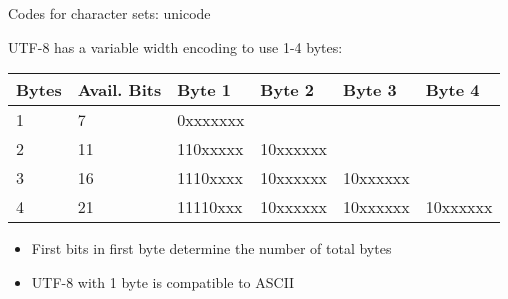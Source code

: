 \documentclass[11pt,compress,t,notes=noshow, xcolor=table]{beamer}
\begin{document}
\begin{vbframe}{Codes for character sets: unicode}
\framebreak

UTF-8 has a variable width encoding to use 1-4 bytes:
  \begin{table}
    \begin{tabular}{llllll}
      \toprule
    Bytes & Avail. Bits & Byte 1   & Byte 2   & Byte 3   & Byte 4   \\ \midrule
    1     & 7           & 0xxxxxxx &          &          &          \\
    2     & 11          & 110xxxxx & 10xxxxxx &          &          \\
    3     & 16          & 1110xxxx & 10xxxxxx & 10xxxxxx &          \\
    4     & 21          & 11110xxx & 10xxxxxx & 10xxxxxx & 10xxxxxx \\
    \bottomrule
    \end{tabular}
  \end{table}
\begin{itemize}
  \item First bits in first byte determine the number of total bytes
  \item UTF-8 with 1 byte is compatible to ASCII
\end{itemize}

\end{vbframe}

\endlecture
\end{document}
